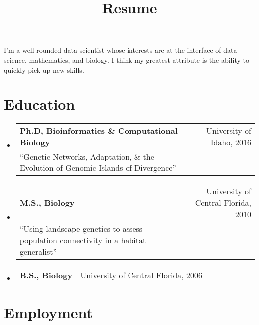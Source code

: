 \documentclass[11pt,letterpaper,sans]{moderncv}        %
\title{Resume }                               %
\begin{document}
\makecvtitle

\small{I'm a well-rounded data scientist whose interests are at the interface of data science, mathematics, and biology. I think my greatest attribute is the ability to quickly pick up new skills.}
\section{Education}

\begin{itemize}
\item{
\centering
  \begin{tabular}{p{14.4cm}r}
\textbf{Ph.D, Bioinformatics \& Computational Biology} & University of Idaho, 2016\\
``Genetic Networks, Adaptation, \& the Evolution of Genomic Islands of Divergence'' & \\
  \end{tabular}
}

\item{
\centering
  \begin{tabular}{p{13cm}r}
\textbf{M.S., Biology} & University of Central Florida, 2010\\
``Using landscape genetics to assess population connectivity in a habitat generalist'' & \\
  \end{tabular}
}

\item{
\centering
  \begin{tabular}{p{13cm}r}
\textbf{B.S., Biology} & University of Central Florida, 2006\\
  \end{tabular}
}

\end{itemize}

\section{Employment}
\end{document}
